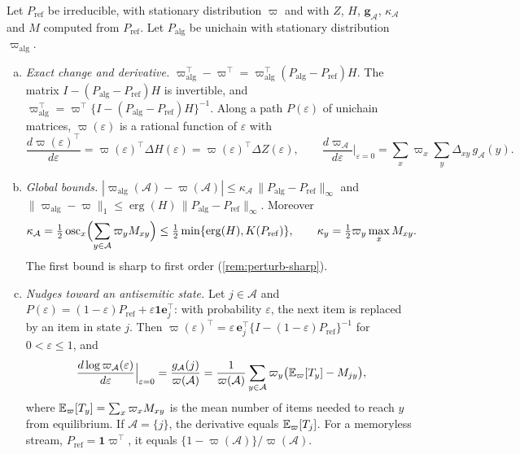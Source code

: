 \begin{theorem}\label{thm:perturb}
Let $P_{\mathrm{ref}}$ be irreducible, with stationary distribution $\varpi$ and with $Z$, $H$, $\bm g_{\mathcal A}$, $\kappa_{\mathcal A}$ and $M$ computed from $P_{\mathrm{ref}}$. Let $P_{\mathrm{alg}}$ be unichain with stationary distribution $\varpi_{\mathrm{alg}}$.
\begin{enumerate}[(a)]
  \item \emph{Exact change and derivative.} $\varpi_{\mathrm{alg}}^{\top}-\varpi^{\top}=\varpi_{\mathrm{alg}}^{\top}(P_{\mathrm{alg}}-P_{\mathrm{ref}})H$. The matrix $I-(P_{\mathrm{alg}}-P_{\mathrm{ref}})H$ is invertible, and $\varpi_{\mathrm{alg}}^{\top}=\varpi^{\top}\{I-(P_{\mathrm{alg}}-P_{\mathrm{ref}})H\}^{-1}$. Along a path $P(\varepsilon)$ of unichain matrices, $\varpi(\varepsilon)$ is a rational function of $\varepsilon$ with
  \[
    \frac{d\varpi(\varepsilon)^{\top}}{d\varepsilon}=\varpi(\varepsilon)^{\top}\Delta H(\varepsilon)=\varpi(\varepsilon)^{\top}\Delta Z(\varepsilon),\qquad
    \frac{d\varpi_{\mathcal A}}{d\varepsilon}\Big|_{\varepsilon=0}=\sum_x\varpi_x\sum_y\Delta_{xy}\,g_{\mathcal A}(y).
  \]
  \item \emph{Global bounds.} $|\varpi_{\mathrm{alg}}(\mathcal A)-\varpi(\mathcal A)|\le\kappa_{\mathcal A}\,\|P_{\mathrm{alg}}-P_{\mathrm{ref}}\|_\infty$ and $\|\varpi_{\mathrm{alg}}-\varpi\|_1\le\operatorname{erg}(H)\,\|P_{\mathrm{alg}}-P_{\mathrm{ref}}\|_\infty$. Moreover
  \[
    \kappa_{\mathcal A}=\tfrac12\operatorname{osc}_x\Bigl(\sum_{y\in\mathcal A}\varpi_yM_{xy}\Bigr)\le\tfrac12\min\{\operatorname{erg}(H),K(P_{\mathrm{ref}})\},
    \qquad \kappa_y=\tfrac12\varpi_y\max_xM_{xy}.
  \]
  The first bound is sharp to first order (\cref{rem:perturb-sharp}).
  \item \emph{Nudges toward an antisemitic state.} Let $j\in\mathcal A$ and $P(\varepsilon)=(1-\varepsilon)P_{\mathrm{ref}}+\varepsilon\bm1\bm e_j^{\top}$: with probability $\varepsilon$, the next item is replaced by an item in state $j$. Then $\varpi(\varepsilon)^{\top}=\varepsilon\,\bm e_j^{\top}\{I-(1-\varepsilon)P_{\mathrm{ref}}\}^{-1}$ for $0<\varepsilon\le1$, and
  \[
    \frac{d\log\varpi_{\mathcal A}(\varepsilon)}{d\varepsilon}\Big|_{\varepsilon=0}=\frac{g_{\mathcal A}(j)}{\varpi(\mathcal A)}
    =\frac{1}{\varpi(\mathcal A)}\sum_{y\in\mathcal A}\varpi_y\bigl(\mathbb{E}_\varpi[T_y]-M_{jy}\bigr),
  \]
  where $\mathbb{E}_\varpi[T_y]=\sum_x\varpi_xM_{xy}$ is the mean number of items needed to reach $y$ from equilibrium. If $\mathcal A=\{j\}$, the derivative equals $\mathbb{E}_\varpi[T_j]$. For a memoryless stream, $P_{\mathrm{ref}}=\bm1\varpi^{\top}$, it equals $\{1-\varpi(\mathcal A)\}/\varpi(\mathcal A)$.

\end{enumerate}
\end{theorem}
